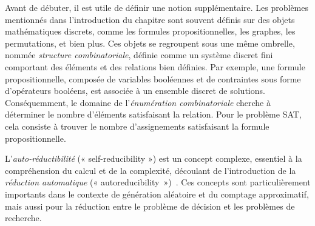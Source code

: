 Avant de débuter, il est utile de définir une notion supplémentaire. Les problèmes mentionnés dans l'introduction du chapitre sont souvent définis sur des objets mathématiques discrets, comme les formules propositionnelles, les graphes, les permutations, et bien plus. Ces objets se regroupent sous une même ombrelle, nommée \textit{structure combinatoriale}, définie comme un système discret fini comportant des éléments et des relations bien définies. Par exemple, une formule propositionnelle, composée de variables booléennes et de contraintes sous forme d'opérateurs booléens, est associée à un ensemble discret de solutions. Conséquemment, le domaine de l'\textit{énumération combinatoriale} cherche à déterminer le nombre d'éléments satisfaisant la relation. Pour le problème SAT, cela consiste à trouver le nombre d'assignements satisfaisant la formule propositionnelle.

L'\textit{auto-réductibilité} (« self-reducibility ») est un concept complexe, essentiel à la compréhension du calcul et de la complexité, découlant de l'introduction de la \textit{réduction automatique} (« autoreducibility »)~\cite{trakhtenbrotAutoreducibility1970, selkeAutoreducibilityFriendsMeasuring2006}. Ces concepts sont particulièrement importants dans le contexte de génération aléatoire et du comptage approximatif, mais aussi pour la réduction entre le problème de décision et les problèmes de recherche.

